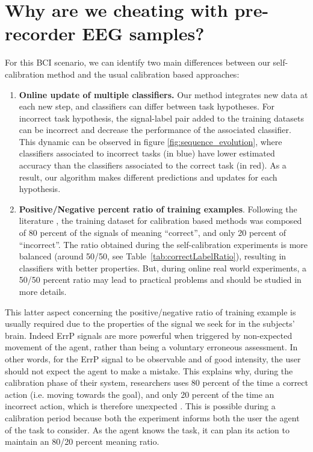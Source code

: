 \section{Why are we cheating with pre-recorder EEG samples?}
\label{chapter:bci:cheating}

For this BCI scenario, we can identify two main differences between our self-calibration method and the usual calibration based approaches:
\begin{enumerate}
\item \textbf{Online update of multiple classifiers.} Our method integrates new data at each new step, and classifiers can differ between task hypotheses. For incorrect task hypothesis, the signal-label pair added to the training datasets can be incorrect and decrease the performance of the associated classifier. This dynamic can be observed in figure \ref{fig:sequence_evolution}, where classifiers associated to incorrect tasks (in blue) have lower estimated accuracy than the classifiers associated to the correct task (in red). As a result, our algorithm makes different predictions and updates for each hypothesis.
\item \textbf{Positive/Negative percent ratio of training examples}. Following the literature \cite{chavarriaga2010learning, iturrate2013task}, the training dataset for calibration based methods was composed of 80 percent of the signals of meaning ``correct'', and only 20 percent of ``incorrect''. The ratio obtained during the self-calibration experiments is more balanced (around 50/50, see Table~\ref{tab:correctLabelRatio}), resulting in classifiers with better properties. But, during online real world experiments, a 50/50 percent ratio may lead to practical problems and should be studied in more details.
\end{enumerate}

This latter aspect concerning the positive/negative ratio of training example is usually required due to the properties of the signal we seek for in the subjects' brain. Indeed ErrP signals are more powerful when triggered by non-expected movement of the agent, rather than being a voluntary erroneous assessment. In other words, for the ErrP signal to be observable and of good intensity, the user should not expect the agent to make a mistake. This explains why, during the calibration phase of their system, researchers uses 80 percent of the time a correct action (i.e. moving towards the goal), and only 20 percent of the time an incorrect action, which is therefore unexpected \cite{chavarriaga2014errare}. This is possible during a calibration period because both the experiment informs both the user the agent of the task to consider. As the agent knows the task, it can plan its action to maintain an 80/20 percent meaning ratio.

